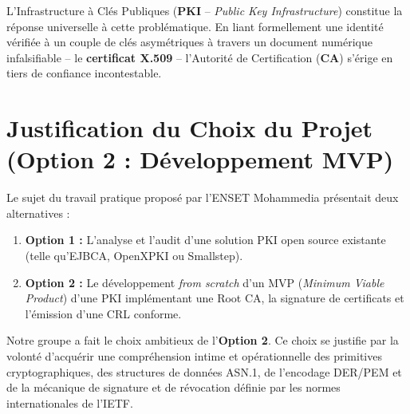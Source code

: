 \documentclass[12pt,a4paper]{report}
\begin{document}
L'Infrastructure à Clés Publiques (\textbf{PKI} -- \textit{Public Key Infrastructure}) constitue la réponse universelle à cette problématique. En liant formellement une identité vérifiée à un couple de clés asymétriques à travers un document numérique infalsifiable -- le \textbf{certificat X.509} -- l'Autorité de Certification (\textbf{CA}) s'érige en tiers de confiance incontestable.

\section{Justification du Choix du Projet (Option 2 : Développement MVP)}
Le sujet du travail pratique proposé par l'ENSET Mohammedia présentait deux alternatives :
\begin{enumerate}
    \item \textbf{Option 1 :} L'analyse et l'audit d'une solution PKI open source existante (telle qu'EJBCA, OpenXPKI ou Smallstep).
    \item \textbf{Option 2 :} Le développement \textit{from scratch} d'un MVP (\textit{Minimum Viable Product}) d'une PKI implémentant une Root CA, la signature de certificats et l'émission d'une CRL conforme.
\end{enumerate}

Notre groupe a fait le choix ambitieux de l'\textbf{Option 2}. Ce choix se justifie par la volonté d'acquérir une compréhension intime et opérationnelle des primitives cryptographiques, des structures de données ASN.1, de l'encodage DER/PEM et de la mécanique de signature et de révocation définie par les normes internationales de l'IETF.
\end{document}
